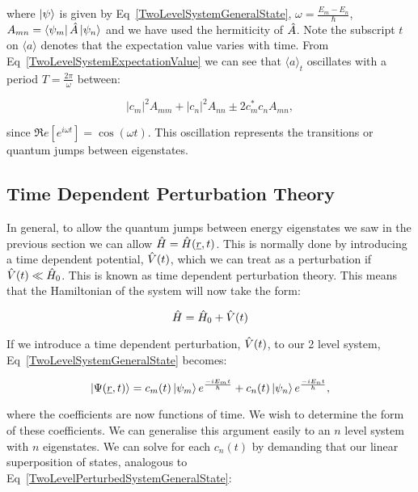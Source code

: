 \noindent where $\ket{\psi}$ is given by Eq~\ref{TwoLevelSystemGeneralState}, $\omega = \frac{E_m - E_n}{\hbar}$, $A_{mn} = \bra{\psi_m}\Hat{A}\ket{\psi_n}$ and we have used the hermiticity of $\Hat{A}$. Note the subscript $t$ on $\langle a \rangle$ denotes that the expectation value varies with time. From Eq~\ref{TwoLevelSystemExpectationValue} we can see that $\langle a \rangle _t$ oscillates with a period $T = \frac{2\pi}{\omega}$ between:

\begin{equation}
    |c_m|^2 A_{mm} + |c_n|^2 A_{nn} \pm 2 c_m^* c_n A_{mn},
\end{equation}

\noindent since $\Re e[e^{i \omega t}] = \cos(\omega t)$. This oscillation represents the transitions or quantum jumps between eigenstates.

\subsection{Time Dependent Perturbation Theory}

In general, to allow the quantum jumps between energy eigenstates we saw in the previous section we can allow $\Hat{H} = \Hat{H}(\underline{r}, t)$. This is normally done by introducing a time dependent potential, $\Hat{V}(t)$, which we can treat as a perturbation if $\Hat{V}(t) \ll \Hat{H}_0$. This is known as time dependent perturbation theory. This means that the Hamiltonian of the system will now take the form:

\begin{equation}
    \Hat{H} = \Hat{H}_0 + \Hat{V}(t)
    \label{TimeDependentHamiltonian}
\end{equation}

\noindent If we introduce a time dependent perturbation, $\Hat{V}(t)$, to our 2 level system, Eq~\ref{TwoLevelSystemGeneralState} becomes:

\begin{equation}
    \ket{\Psi(\underline{r}, t)} = c_m(t) \ket{\psi_m} e^\frac{-i E_m t}{\hbar} + c_n(t) \ket{\psi_n} e^\frac{-i E_n t}{\hbar},
    \label{TwoLevelPerturbedSystemGeneralState}
\end{equation}

\noindent where the coefficients are now functions of time. We wish to determine the form of these coefficients. We can generalise this argument easily to an $n$ level system with $n$ eigenstates. We can solve for each $c_n(t)$ by demanding that our linear superposition of states, analogous to Eq~\ref{TwoLevelPerturbedSystemGeneralState}: 

